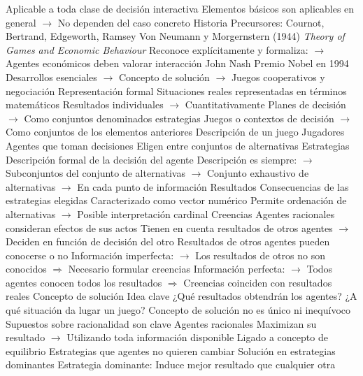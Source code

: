 \documentclass{nuevotema}
\begin{document}
\begin{esquemal}
				\4[] Aplicable a toda clase de decisión interactiva
				\4[] Elementos básicos son aplicables en general
				\4[] $\to$ No dependen del caso concreto
			\3 Historia
				\4 Precursores:
				\4[] Cournot, Bertrand, Edgeworth, Ramsey
				\4 Von Neumann y Morgernstern (1944)
				\4[] \textit{Theory of Games and Economic Behaviour}
				\4[] Reconoce explícitamente y formaliza:
				\4[] $\to$ Agentes económicos deben valorar interacción
				\4 John Nash
				\4[] Premio Nobel en 1994
				\4[] Desarrollos esenciales
				\4[] $\to$ Concepto de solución
				\4[] $\to$ Juegos cooperativos y negociación
			\3 Representación formal
				\4 Situaciones reales representadas en términos matemáticos
				\4[] Resultados individuales
				\4[] $\to$ Cuantitativamente
				\4[] Planes de decisión
				\4[] $\to$ Como conjuntos denominados estrategias
				\4[] Juegos o contextos de decisión
				\4[] $\to$ Como conjuntos de los elementos anteriores
		\2 Descripción de un juego
			\3 Jugadores
				\4 Agentes que toman decisiones
				\4 Eligen entre conjuntos de alternativas
			\3 Estrategias
				\4 Descripción formal de la decisión del agente
				\4 Descripción es siempre:
				\4[] $\to$ Subconjuntos del conjunto de alternativas
				\4[] $\to$ Conjunto exhaustivo de alternativas
				\4[] $\to$ En cada punto de información
			\3 Resultados
				\4 Consecuencias de las estrategias elegidas
				\4 Caracterizado como vector numérico
				\4[] Permite ordenación de alternativas
				\4[] $\to$ Posible interpretación cardinal
			\3 Creencias
				\4 Agentes racionales consideran efectos de sus actos
				\4[] Tienen en cuenta resultados de otros agentes
				\4[] $\to$ Deciden en función de decisión del otro
				\4 Resultados de otros agentes pueden conocerse o no
				\4[] Información imperfecta:
				\4[] $\to$ Los resultados de otros no son conocidos
				\4[] $\Rightarrow$ Necesario formular creencias
				\4[] Información perfecta:
				\4[] $\to$ Todos agentes conocen todos los resultados
				\4[] $\Rightarrow$ Creencias coinciden con resultados reales
		\2 Concepto de solución
			\3 Idea clave
				\4 ¿Qué resultados obtendrán los agentes?
				\4 ¿A qué situación da lugar un juego?
				\4 Concepto de solución no es único ni inequívoco
				\4[] Supuestos sobre racionalidad son clave
				\4 Agentes racionales
				\4[] Maximizan su resultado
				\4[] $\to$ Utilizando toda información disponible
				\4 Ligado a concepto de equilibrio
				\4[] Estrategias que agentes no quieren cambiar
			\3 Solución en estrategias dominantes
				\4 Estrategia dominante:
				\4[] Induce mejor resultado que cualquier otra

\end{esquemal}
\end{document}
